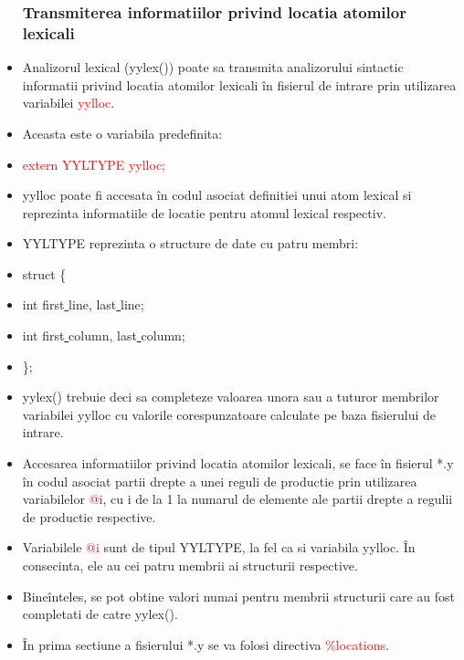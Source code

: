 \documentclass[pdf]{beamer}
\begin{document}
\begin{frame}
\begin{itemize}
\frametitle{Transmiterea informatiilor privind locatia atomilor lexicali}
\item
Analizorul lexical (yylex()) poate sa transmita analizorului sintactic informatii privind locatia atomilor lexicali în fisierul de intrare prin utilizarea variabilei \textcolor{red}{yylloc}.

\item
Aceasta este o variabila predefinita:

\item
\textcolor{red}{extern YYLTYPE yylloc;}

\item
yylloc poate fi accesata în codul asociat definitiei unui atom lexical si reprezinta informatiile de locatie pentru atomul lexical respectiv.

\item
YYLTYPE reprezinta o structure de date cu patru membri:
\item \color{red}
struct \{
\item
\quad int first\underline{ }line, last\underline{ }line;\\
\item
\quad int first\underline{ }column, last\underline{ }column;\\
\item
\};
\item \color{black}
yylex() trebuie deci sa completeze valoarea unora sau a tuturor membrilor variabilei yylloc cu valorile corespunzatoare calculate pe baza fisierului de intrare.

\end{itemize}
\end{frame}



\begin{frame}
\begin{itemize}
\frametitle{Transmiterea informatiilor privind locatia atomilor lexicali}
\item
Accesarea informatiilor privind locatia atomilor lexicali, se face în fisierul *.y în codul asociat partii drepte a unei reguli de productie prin utilizarea variabilelor \textcolor{red}{@i}, cu i de la 1 la numarul de elemente ale partii drepte a regulii de productie respective.
\item
Variabilele \textcolor{red}{@i} sunt de tipul YYLTYPE, la fel ca si variabila yylloc. În consecinta, ele au cei patru membrii ai structurii respective. 
\item
Bineînteles, se pot obtine valori numai pentru membrii structurii care au fost completati de catre yylex().
\item
În prima sectiune a fisierului *.y se va folosi directiva \textcolor{red}{\%locations}.

\end{itemize}
\end{frame}
\end{document}
